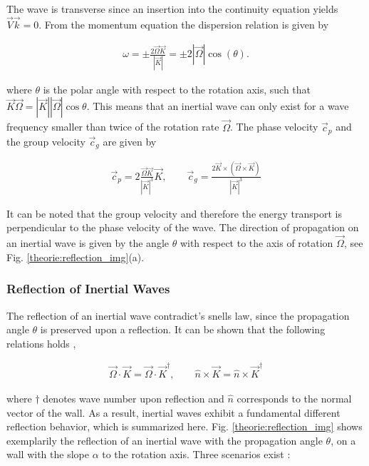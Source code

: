 The wave is transverse since an insertion into the continuity equation yields $\vec{V}\vec{k} = 0$.
From the momentum equation the dispersion relation is given by

\begin{align}
    \label{theorie:eq_rot_dispersion}
    \omega = \pm \frac{ 2\vec{\Omega}\vec{K}}{|\vec{K}|} = \pm 2|\vec{\Omega}|\cos(\theta).
\end{align}

where $\theta$ is the polar angle with respect to the rotation axis,
such that $\vec{K}\vec{\Omega} = |\vec{K}||\vec{\Omega}|\cos{\theta}$.
This means that an inertial wave can only exist for a wave frequency smaller than twice of the rotation rate $\vec{\Omega}$.
The phase velocity $\vec{c}_p$ and the group velocity $\vec{c}_g$ are given by

\begin{align}
    \vec{c}_p = 2 \frac{\vec{\Omega} \vec{K} }{|\vec{K}|^3} \vec{K}, \qquad
    \vec{c}_g = \frac{2 \vec{K} \times (\vec{\Omega} \times \vec{K})}{|\vec{K}|^3}
\end{align}

\clearpage


It can be noted that the group velocity and therefore the energy transport is perpendicular to the phase velocity of the wave.
The direction of propagation on an inertial wave is given by the angle $\theta$ with respect to the axis of rotation $\vec{\Omega}$,
see Fig. \ref{theorie:reflection_img}(a).


\subsubsection{Reflection of Inertial Waves}
\label{theorie:sec:iwreflec}

The reflection of an inertial wave contradict's snells law, since the propagation angle $\theta$ is preserved upon a reflection.
It can be shown that the following relations holds \cite{Beardsley1970},

\begin{align}
\label{theorie:reflections}
\vec{\Omega}\cdot \vec{K} =  \vec{\Omega}\cdot\vec{K}^\dagger, \qquad \hat{n} \times \vec{K} = \hat{n} \times \vec{K}^\dagger
\end{align}

where $\dagger$ denotes wave number upon reflection and $\hat{n}$ corresponds to the normal vector of the wall.
As a result, inertial waves exhibit a fundamental different reflection behavior, which is summarized here.
Fig. \ref{theorie:reflection_img} shows exemplarily the reflection of an inertial wave with the propagation angle $\theta$,
on a wall with the slope $\alpha$ to the rotation axis. Three scenarios exist \citep{Clausen2011}:

